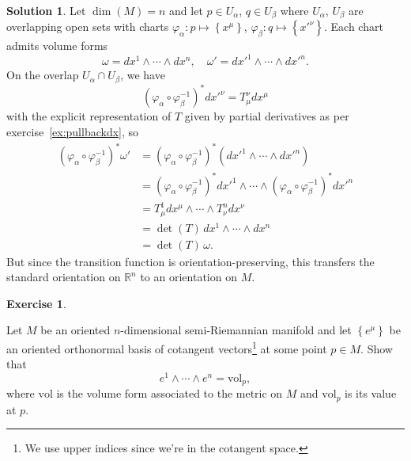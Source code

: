\documentclass[11pt, a4paper]{article}
\theoremstyle{definition}
\newtheorem{ex}{Exercise}[part]
\newtheorem{sol}{Solution}[part]
\begin{document}
\begin{sol}

Let $\dim(M) = n$ and let $p \in U_\alpha$, $q \in U_\beta$ where $U_\alpha$, $U_\beta$ are overlapping open sets with charts $\varphi_\alpha: p \mapsto \left\{x^\mu\right\}$, $\varphi_\beta: q \mapsto \left\{x'^\nu\right\}$. Each chart admits volume forms
\[
    \omega = dx^1 \wedge \cdots \wedge dx^n, \quad
    \omega' = dx'^1 \wedge \cdots \wedge dx'^n.
\]
On the overlap $U_\alpha \cap U_\beta$, we have
\[
{(\varphi_\alpha \circ \varphi_\beta^{-1})}^* dx'^\nu = T_\mu^\nu dx^\mu
\]
with the explicit representation of $T$ given by partial derivatives as per exercise~\ref{ex:pullbackdx}, so
\begin{align*}
    {(\varphi_\alpha \circ \varphi_\beta^{-1})}^* \omega' &= {(\varphi_\alpha \circ \varphi_\beta^{-1})}^* (dx'^1 \wedge \cdots \wedge dx'^n) \\
        &= {(\varphi_\alpha \circ \varphi_\beta^{-1})}^* dx'^1 \wedge \cdots \wedge {(\varphi_\alpha \circ \varphi_\beta^{-1})}^* dx'^n \\
        &= T_\mu^1 dx^\mu \wedge \cdots \wedge T_\nu^n dx^\nu \\
        &= \det(T) \, dx^1 \wedge \cdots \wedge dx^n \\
        &= \det(T) \, \omega.
\end{align*}
But since the transition function is orientation-preserving, this transfers the standard orientation on $\mathbb{R}^n$ to an orientation on $M$.

\end{sol}

\begin{ex}\label{ex:canonicalvolumeform}

Let $M$ be an oriented $n$-dimensional semi-Riemannian manifold and let $\left\{e^\mu\right\}$ be an oriented orthonormal basis of cotangent vectors\footnote{We use upper indices since we're in the cotangent space.} at some point $p \in M$. Show that
\[
    e^1 \wedge \cdots \wedge e^n = \text{vol}_p,
\]
where $\text{vol}$ is the volume form associated to the metric on $M$ and $\text{vol}_p$ is its value at $p$.

\end{ex}
\end{document}
